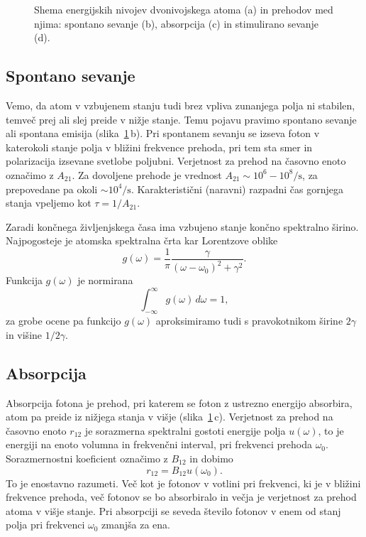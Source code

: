 \begin{figure}[h]
\centering
\def\svgwidth{140truemm} 

\caption{Shema energijskih nivojev dvonivojskega atoma (a) in prehodov med njima:
spontano sevanje (b), absorpcija (c) in stimulirano sevanje (d).}
\label{sl4.1}
\end{figure}

\subsection*{Spontano sevanje}
Vemo, da atom v vzbujenem stanju tudi brez vpliva zunanjega polja
ni stabilen, temveč prej ali slej preide v nižje stanje. Temu pojavu
pravimo spontano sevanje ali spontana emisija (slika~\ref{sl4.1}\,b). 
Pri spontanem sevanju se izseva foton v katerokoli stanje polja v bližini 
frekvence prehoda, pri tem sta smer in polarizacija izsevane svetlobe poljubni.
Verjetnost za prehod na časovno enoto označimo z $A_{21}$.
Za dovoljene prehode je vrednost $A_{21} \sim 10^6-10^8/\si{\second}$, 
za prepovedane pa okoli $\sim 10^4/\si{\second}$. 
Karakteristični (naravni) razpadni čas gornjega stanja vpeljemo kot
$\tau = 1/A_{21}$. 

Zaradi končnega življenjskega časa ima vzbujeno stanje končno spektralno 
širino. Najpogosteje je atomska spektralna črta kar 
Lorentzove oblike
\begin{equation}
g(\omega)=\frac{1}{\pi}\frac{\gamma}{(\omega-\omega_{0})^{2}+\gamma^{2}}.
\label{4.21}
\end{equation}
Funkcija $g(\omega)$ je normirana
\begin{equation}
\int_{-\infty}^\infty g(\omega)\, d\omega=1,
\label{4.20}
\end{equation}
za grobe ocene pa funkcijo $g(\omega)$ aproksimiramo tudi s pravokotnikom širine
$2\gamma$ in višine $1/2\gamma$.

\subsection*{Absorpcija}
Absorpcija fotona je prehod, pri katerem se foton 
z ustrezno energijo absorbira, atom pa preide iz nižjega stanja v višje (slika~\ref{sl4.1}\,c). 
Verjetnost za prehod na časovno enoto $r_{12}$ je sorazmerna spektralni gostoti
energije polja $u(\omega)$, to je energiji na enoto volumna in frekvenčni interval, 
pri frekvenci prehoda $\omega_{0}$. Sorazmernostni koeficient označimo z $B_{12}$ in 
dobimo 
\begin{equation}
r_{12}=B_{12}u(\omega_{0}).
\label{4.16}
\end{equation}
To je enostavno razumeti. Več kot je fotonov v votlini pri frekvenci, ki je
v bližini frekvence prehoda, več fotonov se bo absorbiralo in večja je 
verjetnost za prehod atoma v višje stanje. Pri absorpciji se
seveda število fotonov v enem od stanj polja pri frekvenci
$\omega_{0}$ zmanjša za ena.

